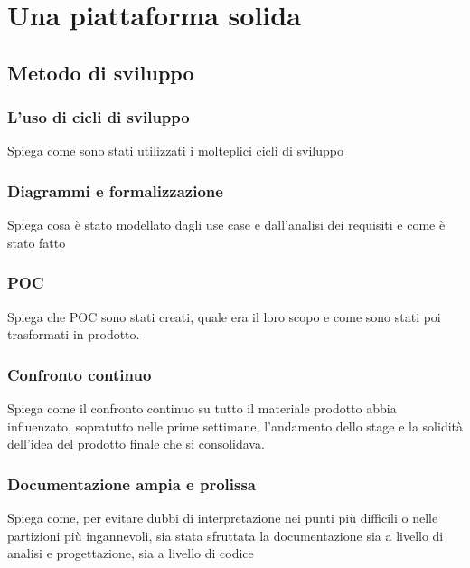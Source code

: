 
\chapter{Una piattaforma solida}
\label{cap:modalita-svolgimento}
\section{Metodo di sviluppo}
\subsection{L'uso di cicli di sviluppo}
Spiega come sono stati utilizzati i molteplici cicli di sviluppo

\subsection{Diagrammi e formalizzazione}
Spiega cosa è stato modellato dagli use case e dall'analisi dei requisiti e come è stato fatto

\subsection{POC}
Spiega che POC sono stati creati, quale era il loro scopo e come sono stati poi trasformati in prodotto.

\subsection{Confronto continuo}
Spiega come il confronto continuo su tutto il materiale prodotto abbia influenzato, sopratutto nelle prime settimane, l'andamento dello stage e la solidità dell'idea del prodotto finale che si consolidava.
\subsection{Documentazione ampia e prolissa}
Spiega come, per evitare dubbi di interpretazione nei punti più difficili o nelle partizioni più ingannevoli, sia stata sfruttata la documentazione sia a livello di analisi e progettazione, sia a livello di codice


